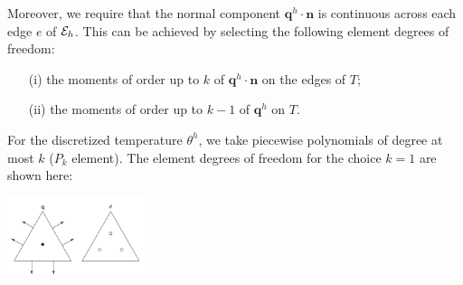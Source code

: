 \begin{itemize}
\begin{displayquote}
{Moreover, we require
that the normal component ${\bm q}^h\cdot {\bm n}$ is continuous across
each edge $e$ of ${\cal E}_h$. This can be achieved by selecting the
following element degrees of freedom:
\begin{itemize}
\item[(i)] the moments of order up to $k$ of ${\bm q}^h\cdot{\bm n}$ on the edges of $T$;
\item[(ii)] the moments of order up to $k-1$ of ${\bm q}^h$ on $T$.
\end{itemize}

For the discretized temperature $\theta^h$, we take piecewise
polynomials of degree at most $k$ ($P_k$ element).
The element degrees of freedom for the choice $k = 1$ are
shown here:

\begin{center}
\includegraphics[width=4cm]{images/pair_raviart-thomas/aubb17a}
\end{center}

}
\end{displayquote}
\end{itemize}
